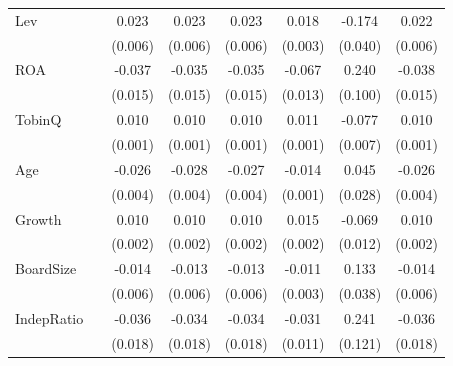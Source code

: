 \begin{table}[htbp]
\begin{tabular}{l*{7}{S}}
\addlinespace
Lev       &                  &    0.023\sym{***}&    0.023\sym{***}&    0.023\sym{***}&    0.018\sym{***}&   -0.174\sym{***}&    0.022\sym{***}\\
          &                  &  (0.006)         &  (0.006)         &  (0.006)         &  (0.003)         &  (0.040)         &  (0.006)         \\
\addlinespace
ROA       &                  &   -0.037\sym{**} &   -0.035\sym{**} &   -0.035\sym{**} &   -0.067\sym{***}&    0.240\sym{**} &   -0.038\sym{**} \\
          &                  &  (0.015)         &  (0.015)         &  (0.015)         &  (0.013)         &  (0.100)         &  (0.015)         \\
\addlinespace
TobinQ    &                  &    0.010\sym{***}&    0.010\sym{***}&    0.010\sym{***}&    0.011\sym{***}&   -0.077\sym{***}&    0.010\sym{***}\\
          &                  &  (0.001)         &  (0.001)         &  (0.001)         &  (0.001)         &  (0.007)         &  (0.001)         \\
\addlinespace
Age       &                  &   -0.026\sym{***}&   -0.028\sym{***}&   -0.027\sym{***}&   -0.014\sym{***}&    0.045         &   -0.026\sym{***}\\
          &                  &  (0.004)         &  (0.004)         &  (0.004)         &  (0.001)         &  (0.028)         &  (0.004)         \\
\addlinespace
Growth    &                  &    0.010\sym{***}&    0.010\sym{***}&    0.010\sym{***}&    0.015\sym{***}&   -0.069\sym{***}&    0.010\sym{***}\\
          &                  &  (0.002)         &  (0.002)         &  (0.002)         &  (0.002)         &  (0.012)         &  (0.002)         \\
\addlinespace
BoardSize &                  &   -0.014\sym{**} &   -0.013\sym{**} &   -0.013\sym{**} &   -0.011\sym{***}&    0.133\sym{***}&   -0.014\sym{**} \\
          &                  &  (0.006)         &  (0.006)         &  (0.006)         &  (0.003)         &  (0.038)         &  (0.006)         \\
\addlinespace
IndepRatio&                  &   -0.036\sym{**} &   -0.034\sym{*}  &   -0.034\sym{*}  &   -0.031\sym{***}&    0.241\sym{**} &   -0.036\sym{**} \\
          &                  &  (0.018)         &  (0.018)         &  (0.018)         &  (0.011)         &  (0.121)         &  (0.018)         \\

\end{tabular}
\end{table}
